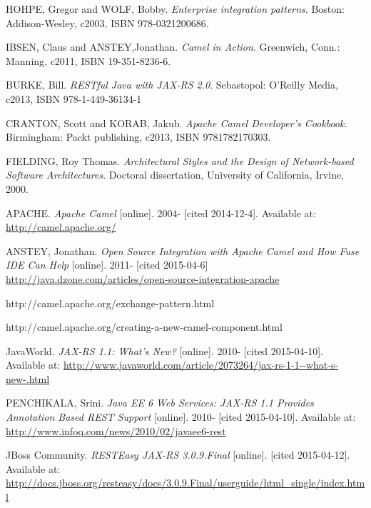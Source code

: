 \documentclass[12pt,final,oneside]{fithesis2}
\begin{document}



\begin{thebibliography}{}


 HOHPE, Gregor and WOLF, Bobby. \textit{Enterprise integration patterns}. Boston: Addison-Wesley, c2003, ISBN 978-0321200686.

 IBSEN, Claus and ANSTEY,Jonathan. \textit{Camel in Action}. Greenwich, Conn.: Manning, c2011, ISBN 19-351-8236-6.

 BURKE, Bill. \textit{RESTful Java with JAX-RS 2.0}. Sebastopol: O'Reilly Media, c2013, ISBN 978-1-449-36134-1

 CRANTON, Scott and KORAB, Jakub. \textit{Apache Camel Developer's Cookbook}.  Birmingham: Packt publishing, c2013, ISBN 9781782170303.

 FIELDING, Roy Thomas. \textit{Architectural Styles and the Design of Network-based Software Architectures}. Doctoral dissertation, University of California, Irvine, 2000. 

 APACHE. \textit{Apache Camel} [online]. 2004- [cited 2014-12-4]. Available at: \url{http://camel.apache.org/}

 ANSTEY, Jonathan. \textit{Open Source Integration with Apache Camel and How Fuse IDE Can Help} [online]. 2011- [cited 2015-04-6] \url{http://java.dzone.com/articles/open-source-integration-apache}

 http://camel.apache.org/exchange-pattern.html

 http://camel.apache.org/creating-a-new-camel-component.html




 JavaWorld. \textit{JAX-RS 1.1: What's New?} [online]. 2010- [cited 2015-04-10]. Available at: \url{http://www.javaworld.com/article/2073264/jax-rs-1-1--what-s-new-.html}


  PENCHIKALA, Srini. \textit{
Java EE 6 Web Services: JAX-RS 1.1 Provides Annotation Based REST Support} [online]. 2010- [cited 2015-04-10]. Available at: \url{http://www.infoq.com/news/2010/02/javaee6-rest}

 JBoss Community. \textit{RESTEasy JAX-RS 3.0.9.Final} [online]. [cited 2015-04-12]. Available at: \url{http://docs.jboss.org/resteasy/docs/3.0.9.Final/userguide/html_single/index.html}


\end{thebibliography}
\end{document}
